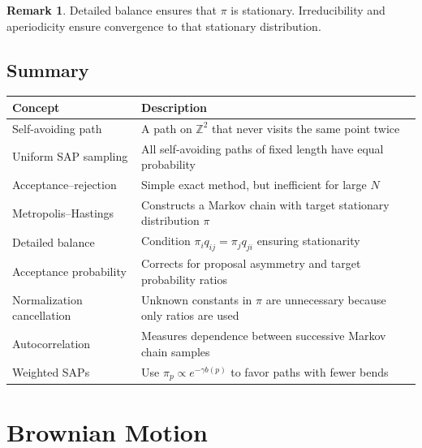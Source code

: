 \documentclass[12pt,oneside]{book}
\numberwithin{equation}{section}
\theoremstyle{definition}
\newtheorem{remark}{Remark}[section]
\theoremstyle{plain}
\theoremstyle{remark}
\newcommand{\Z}{\mathbb{Z}}
\begin{document}
\begin{remark}
Detailed balance ensures that $\pi$ is stationary. Irreducibility and aperiodicity ensure convergence to that stationary distribution.
\end{remark}

\section{Summary}

\begin{center}
\begin{xltabular}{\textwidth}{>{\raggedright\arraybackslash}p{0.28\textwidth}
>{\raggedright\arraybackslash}X}
\toprule
Concept & Description \\
\midrule
Self-avoiding path
& A path on $\Z^2$ that never visits the same point twice \\

Uniform SAP sampling
& All self-avoiding paths of fixed length have equal probability \\

Acceptance--rejection
& Simple exact method, but inefficient for large $N$ \\

Metropolis--Hastings
& Constructs a Markov chain with target stationary distribution $\pi$ \\

Detailed balance
& Condition $\pi_i q_{ij}=\pi_j q_{ji}$ ensuring stationarity \\

Acceptance probability
& Corrects for proposal asymmetry and target probability ratios \\

Normalization cancellation
& Unknown constants in $\pi$ are unnecessary because only ratios are used \\

Autocorrelation
& Measures dependence between successive Markov chain samples \\

Weighted SAPs
& Use $\pi_p\propto e^{-\gamma b(p)}$ to favor paths with fewer bends \\
\bottomrule
\end{xltabular}
\end{center}

\chapter{Brownian Motion}
\end{document}
